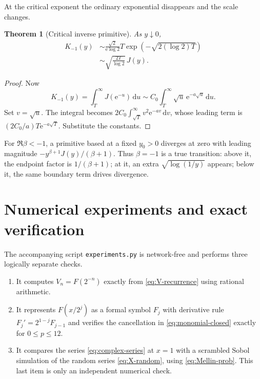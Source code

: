 \documentclass[11pt,oneside]{article}
\numberwithin{equation}{section}
\newtheorem{theorem}{Theorem}[section]
\theoremstyle{definition}
\theoremstyle{remark}
\newcommand{\InvF}{J}
\newcommand{\e}{\mathrm e}
\newcommand{\dd}{\,\mathrm d}
\begin{document}
At the critical exponent the ordinary exponential disappears and the scale
changes.

\begin{theorem}[Critical inverse primitive]
\label{thm:inverse-endpoint-critical}
As $y\downarrow0$,
\begin{align}
 K_{-1}(y)
 &\sim\frac{\sqrt2}{\e\log2}
 T\exp\!\left(-\sqrt{2(\log2)T}\right)                    \label{eq:Kminus1-leading}\\
 &\sim\sqrt{\frac{2T}{\log2}}\,\InvF(y).                  \label{eq:Kminus1-ratio}
\end{align}
\end{theorem}

\begin{proof}
Now
\[
 K_{-1}(y)=\int_T^\infty\InvF(\e^{-u})\dd u
 \sim C_0\int_T^\infty\sqrt u\,\e^{-a\sqrt u}\dd u.
\]
Set $v=\sqrt u$.  The integral becomes
$2C_0\int_{\sqrt T}^\infty v^2\e^{-av}\dd v$, whose leading
term is $(2C_0/a)T\e^{-a\sqrt T}$.  Substitute the constants.
\end{proof}

For $\Re\beta<-1$, a primitive based at a fixed $y_0>0$ diverges at zero with
leading magnitude $-y^{\beta+1}\InvF(y)/(\beta+1)$.  Thus $\beta=-1$ is a true
transition: above it, the endpoint factor is $1/(\beta+1)$; at it, an extra
$\sqrt{\log(1/y)}$ appears; below it, the same boundary term drives divergence.

\section{Numerical experiments and exact verification}
\label{sec:numerics}

The accompanying script \texttt{experiments.py} is network-free and performs
three logically separate checks.

\begin{enumerate}
\item It computes $V_n=F(2^{-n})$ exactly from \eqref{eq:V-recurrence} using
rational arithmetic.
\item It represents $F(x/2^j)$ as a formal symbol $F_j$ with derivative rule
$F_j'=2^{1-j}F_{j-1}$ and verifies the cancellation in
\eqref{eq:monomial-closed} exactly for $0\le p\le12$.
\item It compares the series \eqref{eq:complex-series} at $x=1$ with a
scrambled Sobol simulation of the random series \eqref{eq:X-random}, using
\eqref{eq:Mellin-prob}.  This last item is only an independent numerical check.
\end{enumerate}
\end{document}
